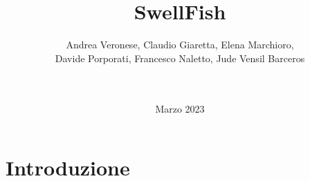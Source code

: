 \documentclass{article}
\title{SwellFish}
\author{Andrea Veronese, Claudio Giaretta, Elena Marchioro,\\
Davide Porporati, Francesco Naletto, Jude Vensil Barceros \\ \\
 \href{swellfish14@gmail.com}{} \\
}
\date{Marzo 2023}
\begin{document}
\maketitle
\section{Introduzione}
\end{document}
